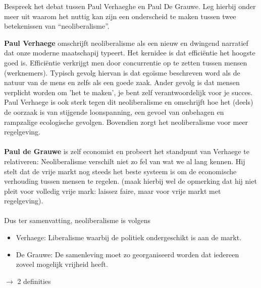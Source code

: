 \documentclass[main.tex]{subfiles}
\begin{document}
\begin{examenvraag}
    \begin{vraag}
        Bespreek het debat tussen Paul Verhaeghe en Paul De Grauwe. Leg hierbij onder meer uit waarom het nuttig kan zijn een onderscheid te maken tussen twee betekenissen van “neoliberalisme”.
    \end{vraag}

    \begin{antwoord}
	    \textbf{Paul Verhaege} omschrijft neoliberalisme als een nieuw en dwingend narratief dat onze
	    moderne maatschapij typeert. Het kernidee is dat efficiëntie het hoogste goed is. Efficiëntie
	    verkrijgt men door concurrentie op te zetten tussen mensen (werknemers). Typisch gevolg hiervan
	    is dat egoïsme beschreven word als de natuur van de mens en zelfs als een goede zaak. Ander gevolg
	    is dat mensen verplicht worden om 'het te maken', je bent zelf verantwoordelijk voor je succes.
	    Paul Verhaege is ook sterk tegen dit neoliberalisme en omschrijft hoe het (deels) de oorzaak is van
	    stijgende loonspanning, een gevoel van onbehagen en rampzalige ecologische gevolgen. Bovendien
	    zorgt
	    het neoliberalisme voor meer regelgeving.\\\\
	    \textbf{Paul de Grauwe} is zelf economist en probeert het standpunt van Verhaege te relativeren:
	    Neoliberalisme verschilt niet zo fel van wat we al lang kennen. Hij stelt dat de vrije markt
	    nog steeds het beste systeem is om de economische verhouding tussen mensen te regelen.
	    (maak hierbij wel de opmerking dat hij niet pleit voor volledig vrije mark: laissez faire, maar voor
	    vrije markt met regelgeving).\\\\
	    Dus ter samenvatting, neoliberalisme is volgens
		\begin{itemize}
			\item Verhaege: Liberalisme waarbij de politiek ondergeschikt is aan de markt.
			\item De Grauwe: De samenleving moet zo georganiseerd worden dat iedereen zoveel mogelijk vrijheid
				    heeft.
		\end{itemize}
	    
	    
	    $\rightarrow$ 2 definities
    \end{antwoord}
\end{examenvraag}
\end{document}

